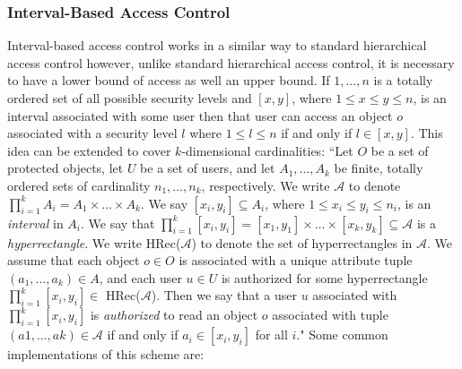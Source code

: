 \documentclass[10pt, titlepage]{article}
\begin{document}
\subsubsection{Interval-Based Access Control}
Interval-based access control works in a similar way to standard hierarchical access control however, unlike standard hierarchical access control, it is necessary to have a lower bound of access as well an upper bound. If $1, \dots , n$ is a totally ordered set of all possible security levels and $[x,y]$, where $1≤x≤y≤n$, is an interval associated with some user then that user can access an object $o$ associated with a security level $l$ where $1≤l≤n$ if and only if $l ∈ [x,y]$.
\newline \indent This idea can be extended to cover $k$-dimensional cardinalities:
\newline \indent ``Let $O$ be a set of protected objects, let $U$ be a set of users, and let $A_{1}, \dots , A_{k}$ be finite, totally ordered sets of cardinality $n_{1} , \dots , n_{k}$, respectively. We write $\mathcal{A}$ to denote $\prod_{i=1}^k A_{i} = A_{1} \times \dots \times A_{k}$.  
\newline \indent We say $[x_{i},y_{i}] ⊆ A_{i}$, where $1≤x_{i}≤y_{i}≤n_{i}$, is an \textit{interval} in $A_{i}$. We say that $\prod_{i=1}^k [x_{i},y_{i}] = [x_{1},y_{1}] \times \dots \times [x_{k},y_{k}] ⊆ \mathcal{A}$ is a \textit{hyperrectangle}. We write HRec($\mathcal{A}$) to denote the set of hyperrectangles in $\mathcal{A}$.
\newline \indent We assume that each object $o ∈ O$ is associated with a unique attribute tuple $(a_{1} , \dots , a_{k}) ∈ A$, and each user $u ∈ U$ is authorized for some hyperrectangle $\prod_{i=1}^k [x_{i},y_{i}] ∈$ HRec($\mathcal{A}$). Then we say that a user $u$ associated with $\prod_{i=1}^k [x_{i},y_{i}]$ is \textit{authorized} to read an object $o$ associated with tuple $(a1 , . . . , ak) ∈ \mathcal{A}$ if and only if $a_{i} ∈ [x_{i},y_{i}]$ for all $i$\cite{mainPaper}."
\newline \indent Some common implementations of this scheme are\cite{mainPaper}:
\end{document}
